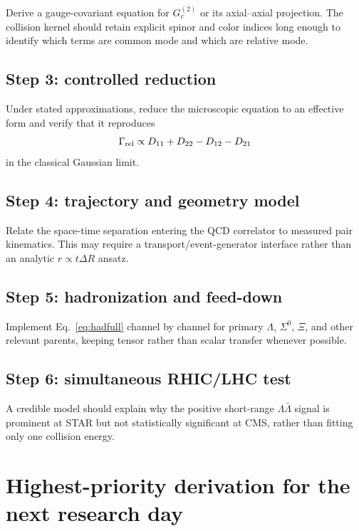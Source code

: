 \documentclass[11pt]{article}
\begin{document}
Derive a gauge-covariant equation for $G_c^{(2)}$ or its axial--axial projection. The collision kernel should retain explicit spinor and color indices long enough to identify which terms are common mode and which are relative mode.

\subsection{Step 3: controlled reduction}

Under stated approximations, reduce the microscopic equation to an effective form and verify that it reproduces
\begin{equation}
\Gamma_{\rm rel}\propto D_{11}+D_{22}-D_{12}-D_{21}
\end{equation}
in the classical Gaussian limit.

\subsection{Step 4: trajectory and geometry model}

Relate the space-time separation entering the QCD correlator to measured pair kinematics. This may require a transport/event-generator interface rather than an analytic $r\propto t\Delta R$ ansatz.

\subsection{Step 5: hadronization and feed-down}

Implement Eq.~\eqref{eq:hadfull} channel by channel for primary $\Lambda$, $\Sigma^0$, $\Xi$, and other relevant parents, keeping tensor rather than scalar transfer whenever possible.

\subsection{Step 6: simultaneous RHIC/LHC test}

A credible model should explain why the positive short-range $\Lambda\bar\Lambda$ signal is prominent at STAR but not statistically significant at CMS, rather than fitting only one collision energy.

\section{Highest-priority derivation for the next research day}
\end{document}
